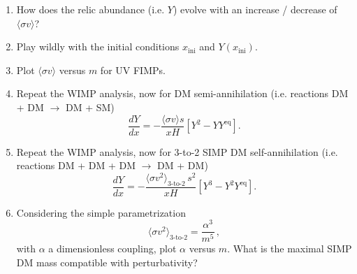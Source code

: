 \documentclass[11pt,a4paper]{article}
\begin{document}
\begin{enumerate}
    \item How does the relic abundance (i.e. $Y$) evolve with an increase / decrease of $\langle \sigma v \rangle$?
    \item Play wildly with the initial conditions $x_{\text{ini}}$ and $Y(x_{\text{ini}})$.
    \item Plot $\langle \sigma v \rangle$ versus $m$ for UV FIMPs.
    
    \item Repeat the WIMP analysis, now for DM semi-annihilation (i.e. reactions DM + DM $\to$ DM + SM)
    \begin{equation} \label{eq:I.23}
        \frac{dY}{dx} = -\frac{\langle \sigma v \rangle s}{x H} \left[ Y^2 - Y Y^{\text{eq}} \right].
    \end{equation}
    
    \item Repeat the WIMP analysis, now for 3-to-2 SIMP DM self-annihilation (i.e. reactions DM + DM + DM $\to$ DM + DM)
    \begin{equation} \label{eq:I.24}
        \frac{dY}{dx} = -\frac{\langle \sigma v^2 \rangle_{\text{3-to-2}} \, s^2}{x H} \left[ Y^3 - Y^2 Y^{\text{eq}} \right].
    \end{equation}
    
    \item Considering the simple parametrization
    \begin{equation} \label{eq:I.25}
        \langle \sigma v^2 \rangle_{\text{3-to-2}} = \frac{\alpha^3}{m^5} \, ,
    \end{equation}
    with $\alpha$ a dimensionless coupling, plot $\alpha$ versus $m$. What is the maximal SIMP DM mass compatible with perturbativity?
    

\end{enumerate}
\end{document}
